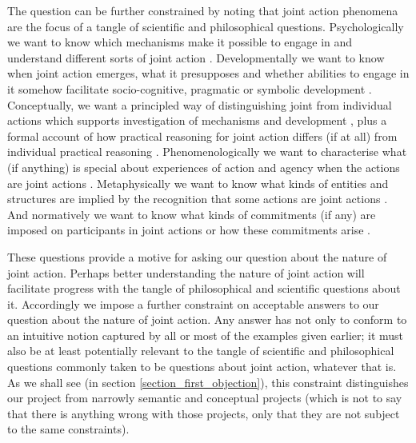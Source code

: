 \documentclass[12pt,a4paper]{extarticle}
\begin{document}
The question can be further constrained by noting that joint action phenomena are the focus of a tangle of scientific and philosophical questions.  Psychologically we want to know which mechanisms make it possible to engage in and understand different sorts of joint action
\citep{vesper_minimal_2010}.  
Developmentally we want to know when joint action emerges, what it presupposes and whether abilities to engage in it somehow facilitate socio-cognitive, pragmatic or symbolic development \citep{Moll:2007gu,Hughes:2004zj,Brownell:2006gu}.  
Conceptually, we want a principled way of distinguishing joint from individual actions which supports investigation of mechanisms and development \citep{Bratman:2009lv}, plus a formal account of how practical reasoning for joint action differs (if at all) from individual practical reasoning \citep{Sugden:2000mw,Gold:2007zd}.  
Phenomenologically we want to characterise what (if anything) is special about experiences of action and agency when the actions are joint actions \citep{Pacherie:2010fk}.  
Metaphysically we want to know what kinds of entities and structures are implied by the recognition that some actions are joint actions \citep{Gilbert:1992rs,Searle:1994lb}.  
And normatively we want to know what kinds of commitments (if any) are imposed on participants in joint actions or how these commitments arise \citep{Roth:2004ki}.

These questions provide a motive for asking our question about the nature of joint action.
Perhaps better understanding the nature of joint action will facilitate  progress with the tangle of philosophical and scientific questions about it.
Accordingly we impose a further constraint on acceptable answers to our question about the nature of joint action.
Any answer has not only to conform to an intuitive notion captured by all or most of the examples given earlier; 
it must also be at least potentially relevant to the tangle of scientific and philosophical questions commonly taken to be questions about joint action, whatever that is.
As we shall see (in section \vref{section_first_objection}), 
this constraint distinguishes our project from narrowly semantic and conceptual projects (which is not to say that there is anything wrong with those projects, only that they are not subject to the same constraints).
\end{document}
